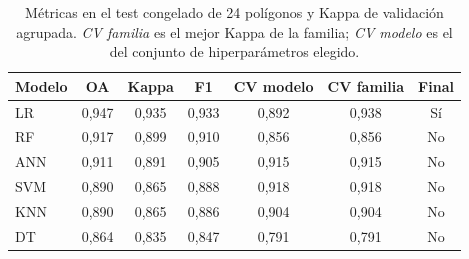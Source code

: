 \begin{table}[htbp]
 \centering
 \small
 \setlength{\tabcolsep}{4pt}
 \caption{Métricas en el test congelado de 24 polígonos y Kappa de validación agrupada. \emph{CV familia} es el mejor Kappa de la familia; \emph{CV modelo} es el del conjunto de hiperparámetros elegido.}
 \label{tab:phase3_metricas}
 \begin{tabular}{lcccccc}
  \toprule
  Modelo & OA & Kappa & F1 & CV modelo & CV familia & Final \\
  \midrule
  LR & 0{,}947 & 0{,}935 & 0{,}933 & 0{,}892 & 0{,}938 & Sí \\
  RF & 0{,}917 & 0{,}899 & 0{,}910 & 0{,}856 & 0{,}856 & No \\
  ANN & 0{,}911 & 0{,}891 & 0{,}905 & 0{,}915 & 0{,}915 & No \\
  SVM & 0{,}890 & 0{,}865 & 0{,}888 & 0{,}918 & 0{,}918 & No \\
  KNN & 0{,}890 & 0{,}865 & 0{,}886 & 0{,}904 & 0{,}904 & No \\
  DT & 0{,}864 & 0{,}835 & 0{,}847 & 0{,}791 & 0{,}791 & No \\
  \bottomrule
 \end{tabular}
\end{table}
